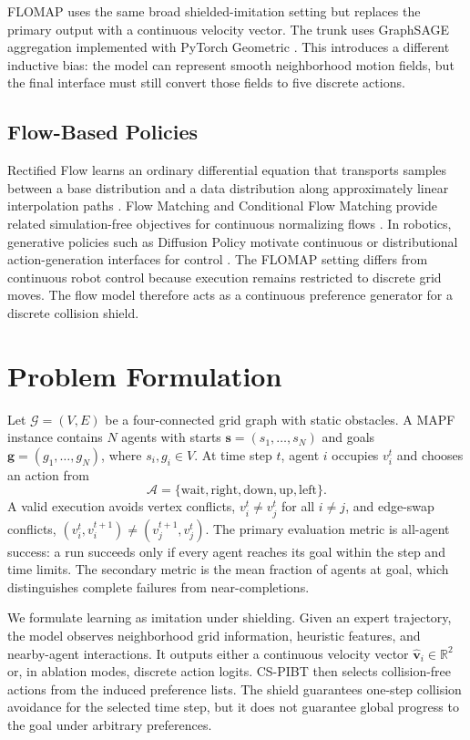 \documentclass[conference]{IEEEtran}
\begin{document}
FLOMAP uses the same broad shielded-imitation setting but replaces the
primary output with a continuous velocity vector.  The trunk uses GraphSAGE
aggregation \cite{hamilton2017graphsage} implemented with PyTorch Geometric
\cite{fey2019pyg}.  This introduces a different inductive bias: the model can
represent smooth neighborhood motion fields, but the final interface must still convert
those fields to five discrete actions.

\subsection{Flow-Based Policies}

Rectified Flow learns an ordinary differential equation that transports samples
between a base distribution and a data distribution along approximately linear
interpolation paths \cite{liu2023rectifiedflow}.  Flow Matching and Conditional Flow Matching
provide related simulation-free objectives for continuous normalizing flows
\cite{lipman2023flowmatching,tong2024cfm}.  In robotics, generative policies
such as Diffusion Policy motivate continuous or distributional action-generation
interfaces for control \cite{chi2023diffusionpolicy}.  The FLOMAP setting
differs from continuous robot control because execution remains restricted to
discrete grid moves.  The flow model therefore acts as a continuous preference
generator for a discrete collision shield.

\section{Problem Formulation}

Let $\mathcal{G}=(V,E)$ be a four-connected grid graph with static obstacles.  A
MAPF instance contains $N$ agents with starts
$\mathbf{s}=(s_1,\ldots,s_N)$ and goals $\mathbf{g}=(g_1,\ldots,g_N)$, where
$s_i,g_i\in V$.  At time step $t$, agent $i$ occupies $v_i^t$ and chooses an
action from
\[
\mathcal{A}=\{\mathrm{wait},\mathrm{right},\mathrm{down},\mathrm{up},\mathrm{left}\}.
\]
A valid execution avoids vertex conflicts,
$v_i^t\neq v_j^t$ for all $i\neq j$, and edge-swap conflicts,
$(v_i^t,v_i^{t+1})\neq(v_j^{t+1},v_j^t)$.  The primary evaluation metric is
all-agent success: a run succeeds only if every agent reaches its
goal within the step and time limits.  The secondary metric is the mean fraction
of agents at goal, which distinguishes complete failures from near-completions.

We formulate learning as imitation under shielding.  Given an expert trajectory,
the model observes neighborhood grid information, heuristic features, and
nearby-agent interactions.  It outputs either a continuous velocity vector
$\hat{\mathbf{v}}_i\in\mathbb{R}^2$ or, in ablation modes, discrete action
logits.  CS-PIBT then selects collision-free actions from the induced preference
lists.  The shield guarantees one-step collision avoidance for the selected
time step, but it does not guarantee global progress to the goal under arbitrary
preferences.
\end{document}
